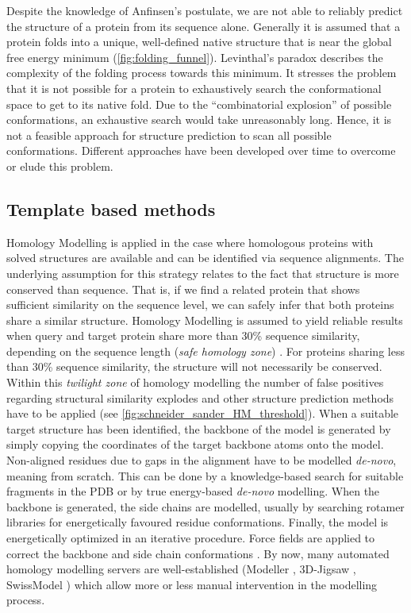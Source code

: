 \documentclass[12pt,a4paper,twoside]{book}
\begin{document}
Despite the knowledge of Anfinsen's postulate, we are not able to
reliably predict the structure of a protein from its sequence alone.
Generally it is assumed that a protein folds into a unique, well-defined
native structure that is near the global free energy minimum
(\autoref{fig:folding_funnel}). Levinthal's paradox
\citep{Levinthal1969} describes the complexity of the folding process
towards this minimum. It stresses the problem that it is not possible
for a protein to exhaustively search the conformational space to get to
its native fold. Due to the ``combinatorial explosion'' of possible
conformations, an exhaustive search would take unreasonably long. Hence,
it is not a feasible approach for structure prediction to scan all
possible conformations. Different approaches have been developed over
time to overcome or elude this problem.

\subsection{Template based methods}\label{template-based-methods}

Homology Modelling is applied in the case where homologous proteins with
solved structures are available and can be identified via sequence
alignments. The underlying assumption for this strategy relates to the
fact that structure is more conserved than sequence. That is, if we find
a related protein that shows sufficient similarity on the sequence
level, we can safely infer that both proteins share a similar structure.
Homology Modelling is assumed to yield reliable results when query and
target protein share more than 30\% sequence similarity, depending on
the sequence length (\textit{safe homology zone}) \citep{Sander1991}.
For proteins sharing less than 30\% sequence similarity, the structure
will not necessarily be conserved. Within this \textit{twilight zone} of
homology modelling the number of false positives regarding structural
similarity explodes \citep{Rost1999} and other structure prediction
methods have to be applied (see
\autoref{fig:schneider_sander_HM_threshold}). When a suitable target
structure has been identified, the backbone of the model is generated by
simply copying the coordinates of the target backbone atoms onto the
model. Non-aligned residues due to gaps in the alignment have to be
modelled \textit{de-novo}, meaning from scratch. This can be done by a
knowledge-based search for suitable fragments in the PDB or by true
energy-based \textit{de-novo} modelling. When the backbone is generated,
the side chains are modelled, usually by searching rotamer libraries for
energetically favoured residue conformations. Finally, the model is
energetically optimized in an iterative procedure. Force fields are
applied to correct the backbone and side chain conformations
\citep{Gu2009}. By now, many automated homology modelling servers are
well-established (Modeller \citep{Eswar2007}, 3D-Jigsaw
\citep{Bates2001}, SwissModel \citep{Arnold2006}) which allow more or
less manual intervention in the modelling process.
\end{document}
